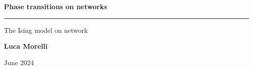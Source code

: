 \begin{titlepage}
	\vspace*{5cm}
	\begin{center}
	\huge \textbf{Phase transitions on networks}
	
	\rule{7cm}{0.4pt} 
	
	\LARGE The Ising model on network
	
	\vspace{40pt}
	
	\LARGE \textbf{Luca Morelli}
	
	\vspace{20pt}
	
	\LARGE June 2024
	
	\end{center}
   
   \vspace{200pt}
   
\end{titlepage}